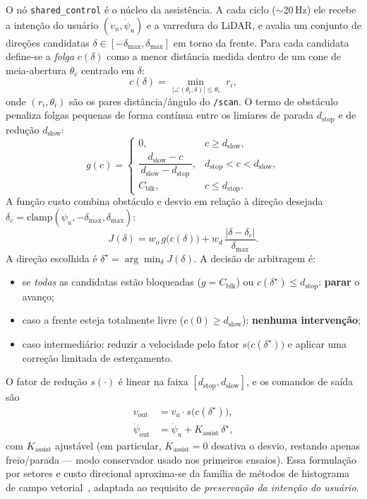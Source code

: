 \documentclass[conference]{IEEEtran}
\begin{document}
O nó \texttt{shared\_control} é o núcleo da assistência. A cada ciclo
($\sim$20\,Hz) ele recebe a intenção do usuário $(v_u,\dot\psi_u)$ e a varredura
do LiDAR, e avalia um conjunto de direções candidatas
$\delta \in [-\delta_{\max}, \delta_{\max}]$ em torno da frente. Para cada
candidata define-se a \emph{folga} $c(\delta)$ como a menor distância medida
dentro de um cone de meia-abertura $\theta_c$ centrado em $\delta$:
\begin{equation}
c(\delta) = \min_{\,|\angle(\theta_i,\delta)| \le \theta_c}\; r_i,
\end{equation}
\noindent onde $(r_i,\theta_i)$ são os pares distância/ângulo do \texttt{/scan}.
O termo de obstáculo penaliza folgas pequenas de forma contínua entre os
limiares de parada $d_{\text{stop}}$ e de redução $d_{\text{slow}}$:
\begin{equation}
g(c) =
\begin{cases}
0, & c \ge d_{\text{slow}},\\[2pt]
\dfrac{d_{\text{slow}} - c}{\,d_{\text{slow}} - d_{\text{stop}}\,}, & d_{\text{stop}} < c < d_{\text{slow}},\\[8pt]
C_{\text{blk}}, & c \le d_{\text{stop}}.
\end{cases}
\end{equation}
A função custo combina obstáculo e desvio em relação à direção desejada
$\delta_c = \mathrm{clamp}(\dot\psi_u,-\delta_{\max},\delta_{\max})$:
\begin{equation}
J(\delta) = w_o\,g\!\big(c(\delta)\big)
          + w_d\,\frac{|\delta - \delta_c|}{\delta_{\max}}.
\end{equation}
A direção escolhida é $\delta^\star = \arg\min_\delta J(\delta)$. A decisão de
arbitragem é:
\begin{itemize}
\item se \emph{todas} as candidatas estão bloqueadas ($g=C_{\text{blk}}$) ou
$c(\delta^\star) \le d_{\text{stop}}$: \textbf{parar} o avanço;
\item caso a frente esteja totalmente livre ($c(0) \ge d_{\text{slow}}$):
\textbf{nenhuma intervenção};
\item caso intermediário: reduzir a velocidade pelo fator
$s\!\big(c(\delta^\star)\big)$ e aplicar uma correção limitada de esterçamento.
\end{itemize}
O fator de redução $s(\cdot)$ é linear na faixa $[d_{\text{stop}},d_{\text{slow}}]$,
e os comandos de saída são
\begin{align}
v_{\text{out}}      &= v_u \cdot s\!\big(c(\delta^\star)\big),\\
\dot\psi_{\text{out}} &= \dot\psi_u + K_{\text{assist}}\,\delta^\star,
\end{align}
\noindent com $K_{\text{assist}}$ ajustável (em particular, $K_{\text{assist}}=0$
desativa o desvio, restando apenas freio/parada --- modo conservador usado nos
primeiros ensaios). Essa formulação por setores e custo direcional aproxima-se
da família de métodos de histograma de campo vetorial~\cite{borenstein1991},
adaptada ao requisito de \emph{preservação da intenção do usuário}.
\end{document}
